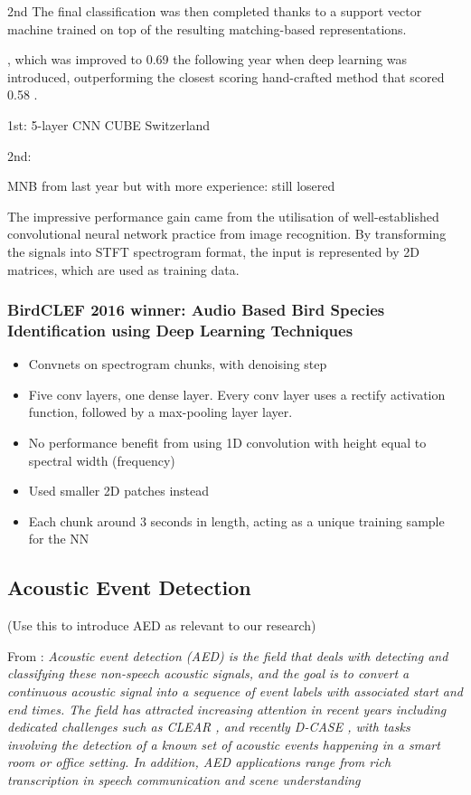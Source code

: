 \documentclass[12pt]{llncs}
\begin{document}
2nd
The final
classification was then completed thanks to a support vector machine trained on
top of the resulting matching-based representations.




, which was improved to 0.69 the following year when deep learning was introduced, outperforming the closest scoring hand-crafted method that scored 0.58 \cite{joly2016lifeclef}. 


1st: 5-layer CNN CUBE Switzerland


2nd:

MNB from last year but with more experience: still losered







The impressive performance gain came from the utilisation of well-established convolutional neural network practice from image recognition. By transforming the signals into STFT spectrogram format, the input is represented by 2D matrices, which are used as training data. 



\subsubsection*{BirdCLEF 2016 winner: Audio Based Bird Species Identification using
Deep Learning Techniques \cite{sprengel2016audio}}
\begin{itemize}
	\item Convnets on spectrogram chunks, with denoising step
	\item Five conv layers, one dense layer. Every conv layer uses a rectify activation function, followed by a max-pooling layer
	layer. 
	\item No performance benefit from using 1D convolution with height equal to spectral width (frequency)
	\item Used smaller 2D patches instead
	\item Each chunk around 3 seconds in length, acting as a unique training sample for the NN
\end{itemize}




\subsection{Acoustic Event Detection}
(Use this to introduce AED as relevant to our research)

From \cite{espi2015exploiting}:
\emph{Acoustic event detection (AED) is the field that deals
with detecting and classifying these non-speech acoustic
signals, and the goal is to convert a continuous acoustic
signal into a sequence of event labels with associated
start and end times. The field has attracted increasing
attention in recent years including dedicated challenges
such as CLEAR \cite{mostefa2007chil}, and recently D-CASE \cite{giannoulis2013detection}, with tasks
involving the detection of a known set of acoustic events
happening in a smart room or office setting. In addition,
AED applications range from rich transcription in
speech communication \cite{mostefa2007chil,giannoulis2013detection} and scene understanding}
\end{document}
